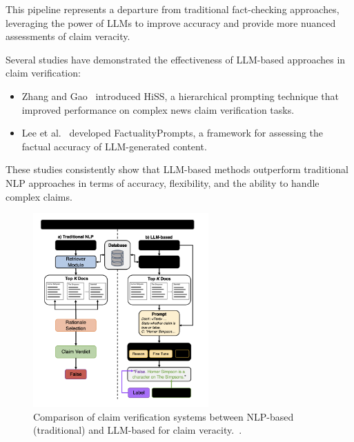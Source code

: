 This pipeline represents a departure from traditional fact-checking approaches, leveraging the power of \ac{LLMs} to improve accuracy and provide more nuanced assessments of claim veracity.

Several studies have demonstrated the effectiveness of LLM-based approaches in claim verification:
\begin{itemize}
    \item Zhang and Gao~\cite{zhang2024reinforcementretrievalleveragingfinegrained} introduced HiSS, a hierarchical prompting technique that improved performance on complex news claim verification tasks.
    \item Lee et al.~\cite{lee2023factualityenhancedlanguagemodels} developed FactualityPrompts, a framework for assessing the factual accuracy of LLM-generated content.
\end{itemize}

These studies consistently show that LLM-based methods outperform traditional NLP approaches in terms of accuracy, flexibility, and the ability to handle complex claims.

\begin{figure}[ht!]
    \centering
    \begin{minipage}[b]{\textwidth}
        \centering
        \includegraphics[width=0.6\textwidth]{res/rel-claim-verification}
        \caption{Comparison of claim verification systems between NLP-based (traditional) and LLM-based for claim veracity.~\cite{dmonte2024claimverificationagelarge}.}
        \label{fig:claim-verification-llm}
    \end{minipage}
\end{figure}

